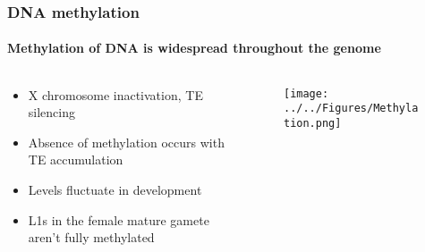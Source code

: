 \documentclass{beamer}
\begin{document}
		\begin{frame} %
			
			\frametitle{DNA methylation}
			\framesubtitle{Methylation of DNA is widespread throughout the genome}
			\begin{columns}
	
				\begin{column}{0.5\linewidth}
		
			\begin{itemize}
				\item X chromosome inactivation, TE silencing
				\item Absence of methylation occurs with TE accumulation 
				\item Levels fluctuate in development
				\item L1s in the female mature gamete aren't fully methylated
			\end{itemize}
				\end{column}
				\begin{column}{0.5\linewidth}
					\begin{figure}
						\centering
						\texttt{[image: ../../Figures/Methylation.png]}
					\end{figure}
				\end{column}
			\end{columns}
		\end{frame}		
		
\end{document}
